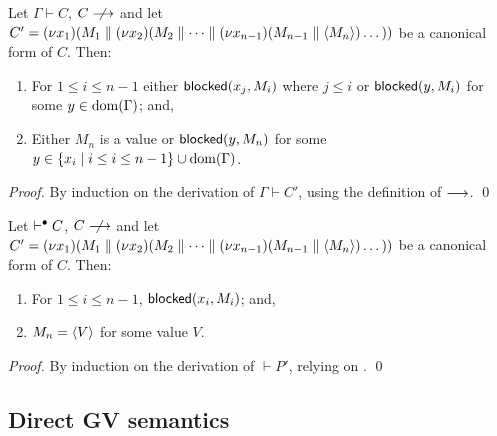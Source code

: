 \documentclass[orivec,envcountsame]{llncs}
\begin{document}
\begin{theorem}\label{thm:progress-open}
  Let $\Gamma \vdash C$, $C \centernot\ceval$ and let $C' = (\nu x_1)(M_1 \parallel (\nu
  x_2)(M_2 \parallel \dots \parallel (\nu x_{n-1})(M_{n-1} \parallel \langle M_n \rangle)\dots))$ be
  a canonical form of $C$.  Then:
  \begin{enumerate}
  \item For $1 \leq i \leq n - 1$ either $\mathsf{blocked}(x_j,M_i)$ where $j \leq i$ or $\mathsf{blocked}(y,M_i)$
    for some $y \in \operatorname{dom}(\Gamma)$; and,
  \item Either $M_n$ is a value or $\mathsf{blocked}(y,M_n)$ for some $y \in \{ x_i \mid i \leq i \leq n -
    1 \} \cup \operatorname{dom}(\Gamma)$.
  \end{enumerate}
\end{theorem}

\begin{proof}
  By induction on the derivation of $\Gamma \vdash C'$, using the definition of $\longrightarrow$. \qed
\end{proof}

\begin{corollary}\label{thm:progress}
  Let $\vdash^{\mathord{\bullet}} C$, $C \centernot\ceval$ and let $C' = (\nu x_1)(M_1 \parallel (\nu
  x_2)(M_2 \parallel \dots \parallel (\nu x_{n-1})(M_{n-1} \parallel \langle M_n \rangle)\dots))$ be
  a canonical form of $C$.  Then:
  \begin{enumerate}
  \item For $1 \leq i \leq n - 1$, $\mathsf{blocked}(x_i,M_i)$; and,
  \item $M_n = \langle V \rangle$ for some value $V$.
  \end{enumerate}
\end{corollary}

\begin{proof}
  By induction on the derivation of $\vdash P'$, relying on .  \qed
\end{proof}

\subsection{Direct GV semantics}

\newcommand{\rpar}[1]{\mathbin{{[}\:\!\!\rangle}_{\!{#1}}\!}
\newcommand{\lrpar}[1]{\mathbin{\langle\hspace{-.3ex}\rangle}_{\!{#1}}\!}
\newcommand{\lpar}[1]{\mathbin{\langle\:\!\!{]}}_{{#1}}\!}

\newcommand{\con}[3]{{#1} \rpar{#2} {#3}}
\end{document}
